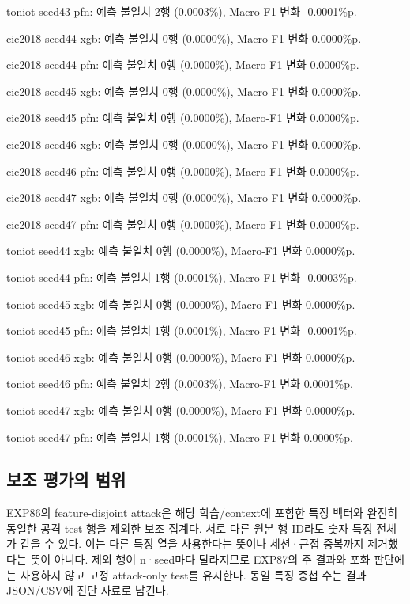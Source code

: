 toniot seed43 pfn: 예측 불일치 2행 (0.0003\%), Macro-F1 변화 -0.0001\%p.

cic2018 seed44 xgb: 예측 불일치 0행 (0.0000\%), Macro-F1 변화 0.0000\%p.

cic2018 seed44 pfn: 예측 불일치 0행 (0.0000\%), Macro-F1 변화 0.0000\%p.

cic2018 seed45 xgb: 예측 불일치 0행 (0.0000\%), Macro-F1 변화 0.0000\%p.

cic2018 seed45 pfn: 예측 불일치 0행 (0.0000\%), Macro-F1 변화 0.0000\%p.

cic2018 seed46 xgb: 예측 불일치 0행 (0.0000\%), Macro-F1 변화 0.0000\%p.

cic2018 seed46 pfn: 예측 불일치 0행 (0.0000\%), Macro-F1 변화 0.0000\%p.

cic2018 seed47 xgb: 예측 불일치 0행 (0.0000\%), Macro-F1 변화 0.0000\%p.

cic2018 seed47 pfn: 예측 불일치 0행 (0.0000\%), Macro-F1 변화 0.0000\%p.

toniot seed44 xgb: 예측 불일치 0행 (0.0000\%), Macro-F1 변화 0.0000\%p.

toniot seed44 pfn: 예측 불일치 1행 (0.0001\%), Macro-F1 변화 -0.0003\%p.

toniot seed45 xgb: 예측 불일치 0행 (0.0000\%), Macro-F1 변화 0.0000\%p.

toniot seed45 pfn: 예측 불일치 1행 (0.0001\%), Macro-F1 변화 -0.0001\%p.

toniot seed46 xgb: 예측 불일치 0행 (0.0000\%), Macro-F1 변화 0.0000\%p.

toniot seed46 pfn: 예측 불일치 2행 (0.0003\%), Macro-F1 변화 0.0001\%p.

toniot seed47 xgb: 예측 불일치 0행 (0.0000\%), Macro-F1 변화 0.0000\%p.

toniot seed47 pfn: 예측 불일치 1행 (0.0001\%), Macro-F1 변화 0.0000\%p.

\subsection{보조 평가의 범위}
EXP86의 feature-disjoint attack은 해당 학습/\allowbreak{}context에 포함한 특징 벡터와 완전히 동일한 공격 test 행을 제외한 보조 집계다. 서로 다른 원본 행 ID라도 숫자 특징 전체가 같을 수 있다. 이는 다른 특징 열을 사용한다는 뜻이나 세션·근접 중복까지 제거했다는 뜻이 아니다. 제외 행이 n·seed마다 달라지므로 EXP87의 주 결과와 포화 판단에는 사용하지 않고 고정 attack-only test를 유지한다. 동일 특징 중첩 수는 결과 JSON/\allowbreak{}CSV에 진단 자료로 남긴다.

